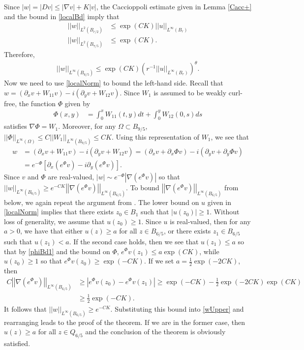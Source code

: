 \documentclass[12pt,reqno]{amsart}
\theoremstyle{plain}
\theoremstyle{definition}
\newcommand{\te}{\theta}
\newcommand{\Om}{\Omega}
\newcommand{\iny}{\infty}
\newcommand{\del}{ \partial}
\newcommand{\su}{\subset}
\newcommand{\gr}{\nabla}
\newcommand{\norm}[1]{\left\vert \left\vert #1\right\vert\right\vert}
\newcommand{\abs}[1]{\left\vert#1\right\vert}
\newcommand{\brac}[1]{\left[#1\right]}
\newcommand{\pr}[1]{\left( #1 \right) }
\begin{document}
Since $\abs{w} = \abs{Dv} \le \abs{\gr v} + K \abs{v}$, the Caccioppoli estimate given in Lemma \ref{Cacc+} and the bound in \eqref{localBd} imply that
\begin{align*}
\norm{w}_{L^2\pr{B_{r/2}}} &\le \exp\pr{C K} \norm{u}_{L^\iny\pr{B_{r}}} \\
\norm{w}_{L^2\pr{B_{7/5}}} &\le \exp\pr{C K}. 
\end{align*}
Therefore,
\begin{align}
\norm{w}_{L^\iny\pr{B_{6/5}}} 
\le \exp\pr{C K} \pr{r^{-1}\norm{u}_{L^\iny\pr{B_{r}}}}^\te .
\label{wUpper}
\end{align}
Now we need to use \eqref{localNorm} to bound the left-hand side.
Recall that $w = \pr{\del_x v + W_{11} v} - i \pr{\del_y v + W_{12} v}$.
Since $W_1$ is assumed to be weakly curl-free, the function $\Phi$ given by
\begin{align*}
\Phi\pr{x,y} &= \int_0^x W_{11}\pr{t, y} dt + \int_0^y W_{12}\pr{0, s} ds
\end{align*}
satisfies $\gr \Phi = W_1$.
Moreover, for any $\Om \su B_{9/5}$, $\norm{\Phi}_{L^\iny\pr{\Om}} \le C \norm{W_1}_{L^\iny\pr{B_{9/5}}} \le C K$.
Using this representation of $W_1$, we see that
\begin{align*}
w 
&= \pr{\del_x v + W_{11} v} - i \pr{\del_y v + W_{12} v} 
= \pr{\del_x v + \del_x \Phi v} - i \pr{\del_y v + \del_y \Phi v} \\
&= e^{-\Phi} \brac{\del_x\pr{e^\Phi v} - i \del_y\pr{e^\Phi v} }.
\end{align*}
Since $v$ and $\Phi$ are real-valued, $\abs{w} \sim e^{-\Phi} \abs{\gr\pr{e^\Phi v}}$ so that $\norm{w}_{L^\iny\pr{B_{6/5}}} \ge e^{- CK} \norm{\gr\pr{e^\Phi v}}_{L^\iny\pr{B_{6/5}}}$.
To bound $\norm{\gr\pr{e^\Phi v}}_{L^\iny\pr{B_{6/5}}}$ from below, we again repeat the argument from \cite{KSW15}.
The lower bound on $u$ given in \eqref{localNorm} implies that there exists $z_0 \in B_1$ such that $\abs{u\pr{z_0}} \ge 1$. 
Without loss of generality, we assume that $u\pr{z_0} \ge 1$.
Since $u$ is real-valued, then for any $a > 0$, we have that either $u\pr{z} \ge a$ for all $z \in B_{6/5}$, or there exists $z_1 \in B_{6/5}$ such that $u\pr{z_1} < a$.
If the second case holds, then we see that $u\pr{z_1} \le a$ so that by \eqref{phiBd1} and the bound on $\Phi$, $e^\Phi v\pr{z_1} \le a \exp\pr{CK}$, while $u\pr{z_0} \ge 1$ so that $e^\Phi v\pr{z_0} \ge \exp\pr{-CK}$.
If we set $a = \frac 1 2\exp\pr{- 2CK}$, then
\begin{align*}
C \norm{\gr (e^\Phi v)}_{L^\iny\pr{B_{6/5}}} 
&\ge \abs{e^\Phi v\pr{z_0} - e^\Phi v\pr{z_1}} 
\ge \exp\pr{-CK} - \frac 1 2\exp\pr{- 2CK}\exp\pr{CK} \\
&\ge \frac 1 2\exp\pr{- CK}.
\end{align*}
It follows that $\norm{w}_{L^\iny\pr{B_{6/5}}} \ge e^{- CK}$.
Substituting this bound into \eqref{wUpper} and rearranging leads to the proof of the theorem.
If we are in the former case, then $u\pr{z} \ge a$ for all $z \in Q_{6/5}$ and the conclusion of the theorem is obviously satisfied.
\end{document}
